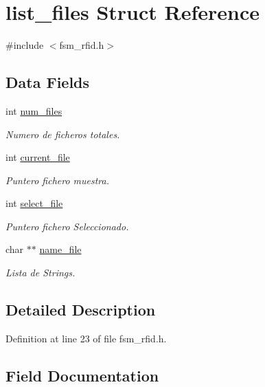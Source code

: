 \hypertarget{structlist__files}{}\section{list\+\_\+files Struct Reference}
\label{structlist__files}


{\ttfamily \#include $<$fsm\+\_\+rfid.\+h$>$}

\subsection*{Data Fields}
\begin{DoxyCompactItemize}
\item 
int \mbox{\hyperlink{structlist__files_a70fbdb4ac81ecb8a257691170b40f4bb}{num\+\_\+files}}
\begin{DoxyCompactList}\small\item\em Numero de ficheros totales. \end{DoxyCompactList}\item 
int \mbox{\hyperlink{structlist__files_a5ab6e21d40127aa921eca974d3573254}{current\+\_\+file}}
\begin{DoxyCompactList}\small\item\em Puntero fichero muestra. \end{DoxyCompactList}\item 
int \mbox{\hyperlink{structlist__files_ab8e9545f9cf8e60731a881b07d37a134}{select\+\_\+file}}
\begin{DoxyCompactList}\small\item\em Puntero fichero Seleccionado. \end{DoxyCompactList}\item 
char $\ast$$\ast$ \mbox{\hyperlink{structlist__files_ac683a830b7c1fd9d1fdee795b2b5e8a0}{name\+\_\+file}}
\begin{DoxyCompactList}\small\item\em Lista de Strings. \end{DoxyCompactList}\end{DoxyCompactItemize}


\subsection{Detailed Description}


Definition at line 23 of file fsm\+\_\+rfid.\+h.



\subsection{Field Documentation}
\mbox{\label{structlist__files_a5ab6e21d40127aa921eca974d3573254}} 
